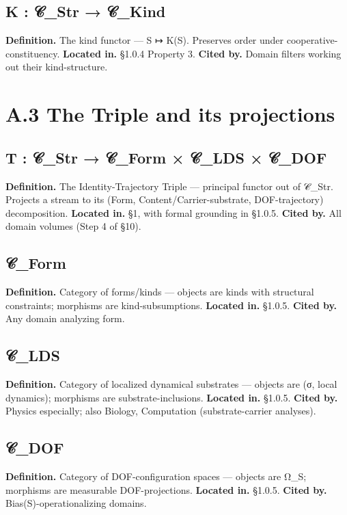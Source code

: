 \documentclass[11pt, openany]{book}
\newcommand{\sectionbreak}{\clearpage}
\begin{document}
\subsection{K : 𝒞\_\allowbreak{}Str → 𝒞\_\allowbreak{}Kind}
\textbf{Definition.} The kind functor --- S ↦ K(S). Preserves order under cooperative-constituency.
\textbf{Located in.} §1.0.4 Property 3.
\textbf{Cited by.} Domain filters working out their kind-structure.

\sectionbreak

\section{A.3 The Triple and its projections}

\subsection{T : 𝒞\_\allowbreak{}Str → 𝒞\_\allowbreak{}Form × 𝒞\_\allowbreak{}LDS × 𝒞\_\allowbreak{}DOF}
\textbf{Definition.} The Identity-Trajectory Triple --- principal functor out of 𝒞\_\allowbreak{}Str. Projects a stream to its (Form, Content/Carrier-substrate, DOF-trajectory) decomposition.
\textbf{Located in.} §1, with formal grounding in §1.0.5.
\textbf{Cited by.} All domain volumes (Step 4 of §10).

\subsection{𝒞\_\allowbreak{}Form}
\textbf{Definition.} Category of forms/kinds --- objects are kinds with structural constraints; morphisms are kind-subsumptions.
\textbf{Located in.} §1.0.5.
\textbf{Cited by.} Any domain analyzing form.

\subsection{𝒞\_\allowbreak{}LDS}
\textbf{Definition.} Category of localized dynamical substrates --- objects are (σ, local dynamics); morphisms are substrate-inclusions.
\textbf{Located in.} §1.0.5.
\textbf{Cited by.} Physics especially; also Biology, Computation (substrate-carrier analyses).

\subsection{𝒞\_\allowbreak{}DOF}
\textbf{Definition.} Category of DOF-configuration spaces --- objects are Ω\_\allowbreak{}S; morphisms are measurable DOF-projections.
\textbf{Located in.} §1.0.5.
\textbf{Cited by.} Bias(S)-operationalizing domains.
\end{document}
